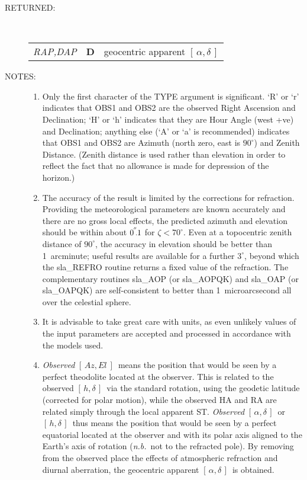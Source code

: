 \documentclass[11pt,twoside]{article}
\newcommand{\radec}     {$[\,\alpha,\delta\,]$}
\newcommand{\hadec}     {$[\,h,\delta\,]$}
\newcommand{\azel}      {$[\,Az,El~]$}
\newcommand{\arcsec}[2] {\arcseci{#1}$\hspace{-0.4em}.#2$}
\newcommand{\arcsec}[2] {
      {$#1\hspace{-0.05em}^{'\hspace{-0.1em}'}\hspace{-0.4em}.#2$}
   }
\newcommand{\arcseci}[1] {$#1\hspace{-0.05em}$\raisebox{-0.5ex}
                         {$^{'\hspace{-0.1em}'}$}}
\renewcommand{\arcseci}[1] {$#1\hspace{-0.05em}^{'\hspace{-0.1em}'}$}
\newlength{\oldspacing}
\newcommand{\args}[2]
{
  \goodbreak
  \setlength{\oldspacing}{\topsep}
  \setlength{\topsep}{0.3ex}
  \begin{description}
  \item[#1]:\\[1.5ex]
    \begin{tabular}{p{7em}p{6em}p{22em}}
      #2
    \end{tabular}
  \end{description}
  \setlength{\topsep}{\oldspacing}
}
\renewcommand{\args}[2]
   {
     \begin{description}
        \item[#1:]\\
        \begin{tabular}{p{7em}p{6em}l}
           #2
        \end{tabular}
     \end{description}
   }
\newcommand{\spec}[3]
{
  {\em {#1}} & {\bf \mbox{#2}} & {#3}
}
\newcommand{\notes}[1]
{
  \goodbreak
  \setlength{\oldspacing}{\topsep}
  \setlength{\topsep}{0.3ex}
  \begin{description}
    \item[NOTES]:
        #1
  \end{description}
  \setlength{\topsep}{\oldspacing}
}
\renewcommand{\notes}[1]
   {
      \begin{description}
         \item[NOTES:]
            #1
      \end{description}
   }
\begin{document}
\args{RETURNED}
{
 \spec{RAP,DAP}{D}{geocentric apparent \radec}
}
\notes
{
 \begin{enumerate}
  \item Only the first character of the TYPE argument is significant.
        `R' or `r' indicates that OBS1 and OBS2 are the observed Right
        Ascension and Declination;  `H' or `h' indicates that they are
        Hour Angle (west +ve) and Declination; anything else (`A' or
        `a' is recommended) indicates that OBS1 and OBS2 are Azimuth
        (north zero, east is $90^{\circ}$) and Zenith Distance.  (Zenith
        distance is used rather than elevation in order to reflect the
        fact that no allowance is made for depression of the horizon.)
  \item The accuracy of the result is limited by the corrections for
        refraction.  Providing the meteorological parameters are
        known accurately and there are no gross local effects, the
        predicted azimuth and elevation should be within about
        \arcsec{0}{1} for $\zeta<70^{\circ}$.  Even
        at a topocentric zenith distance of
        $90^{\circ}$, the accuracy in elevation should be better than
        1~arcminute;  useful results are available for a further
        $3^{\circ}$, beyond which the sla\_REFRO routine returns a
        fixed value of the refraction.  The complementary
        routines sla\_AOP (or sla\_AOPQK) and sla\_OAP (or sla\_OAPQK)
        are self-consistent to better than 1~microarcsecond all over
        the celestial sphere.
  \item It is advisable to take great care with units, as even
        unlikely values of the input parameters are accepted and
        processed in accordance with the models used.
  \item {\it Observed}\/ \azel\ means the position that would be seen by a
        perfect theodolite located at the observer.  This is
        related to the observed \hadec\ via the standard rotation, using
        the geodetic latitude (corrected for polar motion), while the
        observed HA and RA are related simply through the local
        apparent ST.  {\it Observed}\/ \radec\ or \hadec\ thus means the
        position that would be seen by a perfect equatorial located
        at the observer and with its polar axis aligned to the
        Earth's axis of rotation ({\it n.b.}\ not to the refracted pole).
        By removing from the observed place the effects of
        atmospheric refraction and diurnal aberration, the
        geocentric apparent \radec\ is obtained.

\end{enumerate}}
\end{document}
